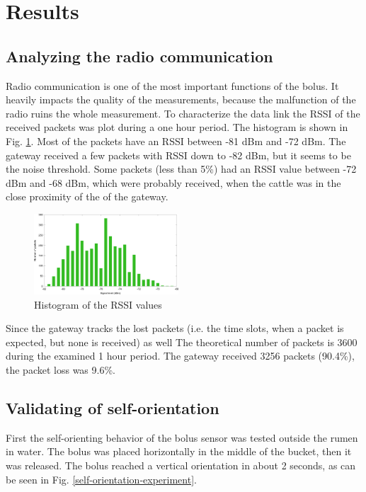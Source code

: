 \documentclass[conference]{IEEEtran}
\begin{document}
\section{Results}

\subsection{Analyzing the radio communication}

Radio communication is one of the most important functions of the bolus. It
heavily impacts the quality of the measurements, because the malfunction of the
radio ruins the whole measurement. To characterize the data link the RSSI of
the received packets was plot during a one hour period. The histogram is shown
in Fig. \ref{rssi-hist}. Most of the packets have an RSSI between -81 dBm and
-72 dBm. The gateway received a few packets with RSSI down to -82 dBm, but it
seems to be the noise threshold. Some packets (less than 5\%) had an RSSI value
between -72 dBm and -68 dBm, which were probably received, when the cattle was
in the close proximity of the of the gateway.

\begin{figure}[htbp]
  \centerline{\includegraphics[width=0.48\textwidth]{fig/rssi_hist.png}}
  \caption{Histogram of the RSSI values}
  \label{rssi-hist}
\end{figure}

Since the gateway tracks the lost packets (i.e. the time slots, when a packet
is expected, but none is received) as well The theoretical number of packets is
3600 during the examined 1 hour period. The gateway received 3256 packets
(90.4\%), the packet loss was 9.6\%.

\subsection{Validating of self-orientation}

First the self-orienting  behavior of the bolus sensor was tested outside the
rumen in water. The bolus was placed horizontally in the middle of the bucket,
then it was released. The bolus reached a vertical orientation in about 2 seconds,
as can be seen in Fig. \ref{self-orientation-experiment}.
\end{document}
